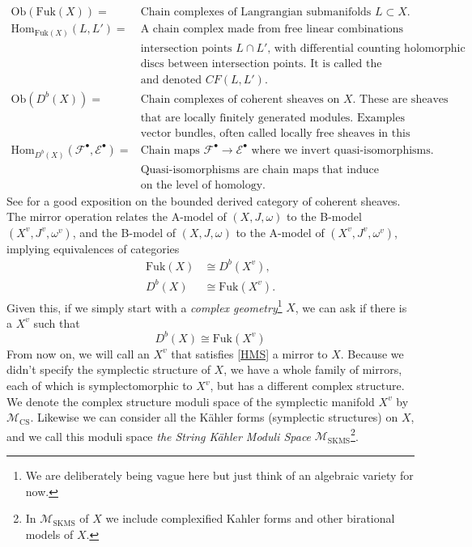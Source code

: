 \documentclass[oneside,reqno]{amsart}
\theoremstyle{definition}
\theoremstyle{definition}
\theoremstyle{definition}
\theoremstyle{definition}
\newcommand{\Es}{\mathcal{E}}
\newcommand{\Fs}{\mathcal{F}}
\begin{document}
\begin{align*}
    \text{Ob}(\text{Fuk}(X)) =& \text{Chain complexes of Langrangian submanifolds }L \subset X. \\
    \text{Hom}_{\text{Fuk}(X)}(L,L') =& \text{A chain complex made from free linear combinations of} \\
    &\text{intersection points $L \cap L'$, with differential counting holomorphic} \\
    &\text{discs between intersection points. It is called the Floer complex} \\
    &\text{and denoted } CF(L,L'). \\
    \text{Ob}(D^b(X)) =& \text{Chain complexes of coherent sheaves on } X.\text{ These are sheaves} \\
    &\text{that are locally finitely generated modules. Examples include } \\
    &\text{vector bundles, often called locally free sheaves in this context.} \\
    \text{Hom}_{D^b(X)}(\Fs^{\bullet},\Es^{\bullet}) =& \text{Chain maps $\Fs^{\bullet} \to \Es^{\bullet}$ where we invert quasi-isomorphisms.} \\
    &\text{Quasi-isomorphisms are chain maps that induce isomorphisms} \\
    &\text{on the level of homology.}
\end{align*}
See \cite[Chapter 2]{huybrechts} for a good exposition on the bounded derived category of coherent sheaves. The mirror operation relates the A-model of $(X,J,\omega)$ to the B-model $(X^{v},J^{v},\omega^{v})$, and the B-model of $(X,J,\omega)$ to the A-model of $(X^{v},J^{v},\omega^{v})$, implying equivalences of categories
\begin{align*}
    \text{Fuk}(X) &\cong D^b(X^{v}), \\
     D^b(X) &\cong \text{Fuk}(X^{v}).
\end{align*}
Given this, if we simply start with a \textit{complex geometry}\footnote{We are deliberately being vague here but just think of an algebraic variety for now.} $X$, we can ask if there is a  $X^{v}$ such that 
\begin{equation}
D^b(X) \cong \text{Fuk}(X^{v})
\label{HMS}
\end{equation}
From now on, we will call an $X^v$ that satisfies \eqref{HMS} a mirror to $X$. Because we didn't specify the symplectic structure of $X$, we have a whole family of mirrors, each of which is symplectomorphic to $X^v$, but has a different complex structure. We denote the complex structure moduli space of the symplectic manifold $X^v$ by $\mathcal{M}_{\text{CS}}$. Likewise we can consider all the Kähler forms (symplectic structures) on $X$, and we call this moduli space \textit{the String Kähler Moduli Space} $\mathcal{M}_{\text{SKMS}}$\footnote{In $\mathcal{M}_{\text{SKMS}}$ of $X$ we include complexified Kahler forms and other birational models of $X$.}.\\
\end{document}
